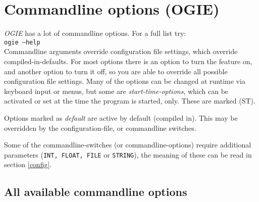 \section{Commandline options (OGIE)}
\label{cmdline}

\emph{OGIE} has a lot of commandline options. For a full list try:\\
\texttt{ogie --help} \\
Commandline arguments override configuration file settings, which override
compiled-in-defaults. For most options there is an option to turn the feature on, and another option to turn it off, so you are able to override all
possible configuration file settings. 
Many of the options can be changed at runtime via keyboard input or menus, but some are \emph{start-time-options}, which can be activated or set at the time the program is started, only.
These are marked (ST).

Options marked as \emph{default} are active by default (compiled in). This may be overridden by the configuration-file, or commandline switches.

Some of the commandline-switches (or commandline-options) require  additional parameters (\texttt{INT, FLOAT, FILE} or \texttt{STRING}), the meaning of these can be read in section \ref{config}.

\subsection{All available commandline options}

